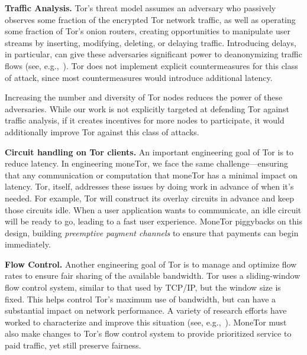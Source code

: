 \textbf{Traffic Analysis.}
Tor's threat model assumes an adversary who passively observes some fraction of the encrypted Tor network traffic, as well as operating some fraction of Tor's onion routers, creating opportunities to manipulate user streams by inserting, modifying, deleting, or delaying traffic.
Introducing delays, in particular, can give these adversaries significant power to deanonymizing traffic flows (see, e.g.,~\cite{fu2009one,rochet2018dropping}).
Tor does not implement explicit countermeasures for this class of attack, since most countermeasures would introduce additional latency.

Increasing the number and diversity of Tor nodes reduces the power of these adversaries.
While our work is not explicitly targeted at defending Tor against traffic analysis, if it creates incentives for more nodes to participate, it would additionally improve Tor against this class of attacks.

\medskip \noindent \textbf{Circuit handling on Tor clients.}
An important engineering goal of Tor is to reduce latency.
In engineering moneTor, we face the same challenge---ensuring that any communication or computation that moneTor has a minimal impact on latency.
Tor, itself, addresses these issues by doing work in advance of when it's needed.
For example, Tor will construct its overlay circuits in advance and keep those circuits idle.
When a user application wants to communicate, an idle circuit will be ready to go, leading to a fast user experience.
MoneTor piggybacks on this design, building {\em preemptive payment channels} to ensure that payments can begin immediately.

\medskip \noindent\textbf{Flow Control.}
Another engineering goal of Tor is to manage and optimize flow rates to ensure fair sharing of the available bandwidth.
Tor uses a sliding-window flow control system, similar to that used by TCP/IP, but the window size is fixed.
This helps control Tor's maximum use of bandwidth, but can have a substantial impact on network performance.
A variety of research efforts have worked to characterize and improve this situation (see, e.g.,~\cite{pets2011-defenestrator,mind-the-gap-2016}).
MoneTor must also make changes to Tor's flow control system to provide prioritized service to paid traffic, yet still preserve fairness.

